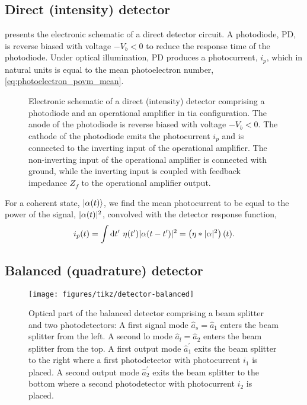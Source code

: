 \FloatBarrier
\subsection{Direct (intensity) detector}

 presents the electronic schematic of a direct detector circuit.
A photodiode, PD, is reverse biased with voltage $-V_b<0$ to reduce the response time of the photodiode.
Under optical illumination, PD produces a photocurrent, $i_p$, which in natural units is equal to the mean photoelectron number, \cref{eq:photoelectron_povm_mean}.
\begin{figure}[htb]
    \centering
    
    \caption{Electronic schematic of a direct (intensity) detector comprising a photodiode and an operational amplifier in \gls{tia} configuration. The anode of the photodiode is reverse biased with voltage $-V_b<0$. The cathode of the photodiode emits the photocurrent $i_p$ and is connected to the inverting input of the operational amplifier. The non-inverting input of the operational amplifier is connected with ground, while the inverting input is coupled with feedback impedance $Z_f$ to the operational amplifier output.}\label{fig:detector_direct}
\end{figure}
For a coherent state, $\lvert\alpha(t)\rangle$, we find the mean photocurrent to be equal to the power of the signal, $\lvert\alpha(t)\rvert^2$, convolved with the detector response function,
\begin{equation}
	i_p(t)
	=
	\int\dd{t^\prime}
	\eta(t^\prime)
	\abs{\alpha(t-t^\prime)}^2
	=
	\left(\eta*\abs{\alpha}^2\right)(t)
	\label{eq:detector_direct_photocurrent}
	.
\end{equation}

\FloatBarrier
\subsection{Balanced (quadrature) detector}


\begin{figure}[htb]
    \centering
    \texttt{[image: figures/tikz/detector-balanced]}
    \caption{Optical part of the balanced detector comprising a beam splitter and two photodetectors: A first signal mode $\hat{a}_s=\hat{a}_1$ enters the beam splitter from the left. A second \gls{lo} mode $\hat{a}_l=\hat{a}_2$ enters the beam splitter from the top. A first output mode $\hat{a}_1^\prime$ exits the beam splitter to the right where a first photodetector with photocurrent $i_1$ is placed. A second output mode $\hat{a}_2^\prime$ exits the beam splitter to the bottom where a second photodetector with photocurrent $i_2$ is placed.}\label{fig:detector_balanced_optics}
\end{figure}

